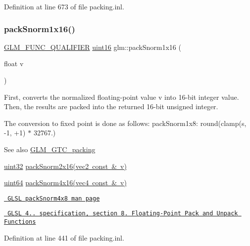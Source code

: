 Definition at line 673 of file packing.\+inl.

\mbox{\label{group__gtc__packing_gac29411d6c0f6ed0fe9f0396dfe92e0e8}} 
\subsubsection{\texorpdfstring{packSnorm1x16()}{packSnorm1x16()}}
{\footnotesize\ttfamily \mbox{\hyperlink{setup_8hpp_a33fdea6f91c5f834105f7415e2a64407}{G\+L\+M\+\_\+\+F\+U\+N\+C\+\_\+\+Q\+U\+A\+L\+I\+F\+I\+ER}} \mbox{\hyperlink{group__gtc__type__precision_gad8c2939e1fdd8e5828b31d95c52255d5}{uint16}} glm\+::pack\+Snorm1x16 (\begin{DoxyParamCaption}\item[{float}]{v }\end{DoxyParamCaption})}

First, converts the normalized floating-\/point value v into 16-\/bit integer value. Then, the results are packed into the returned 16-\/bit unsigned integer.

The conversion to fixed point is done as follows\+: pack\+Snorm1x8\+: round(clamp(s, -\/1, +1) $\ast$ 32767.)

\begin{DoxySeeAlso}{See also}
\mbox{\hyperlink{group__gtc__packing}{G\+L\+M\+\_\+\+G\+T\+C\+\_\+packing}} 

\mbox{\hyperlink{group__gtc__type__precision_ga202b6a53c105fcb7e531f9b443518451}{uint32}} \mbox{\hyperlink{group__core__func__packing_ga0c8005de240d6c4ca3d16c7bee25c622}{pack\+Snorm2x16(vec2 const \& v)}} 

\mbox{\hyperlink{group__gtc__type__precision_gae3632bf9b37da66233d78930dd06378a}{uint64}} \mbox{\hyperlink{group__gtc__packing_ga9b237d7c66b7a71964e6d1f4dc06539f}{pack\+Snorm4x16(vec4 const \& v)}} 

\href{http://www.opengl.org/sdk/docs/manglsl/xhtml/packSnorm4x8.xml}{\texttt{ G\+L\+SL pack\+Snorm4x8 man page}} 

\href{http://www.opengl.org/registry/doc/GLSLangSpec.4.20.8.pdf}{\texttt{ G\+L\+SL 4.. specification, section 8. Floating-\/\+Point Pack and Unpack Functions}} 
\end{DoxySeeAlso}


Definition at line 441 of file packing.\+inl.

